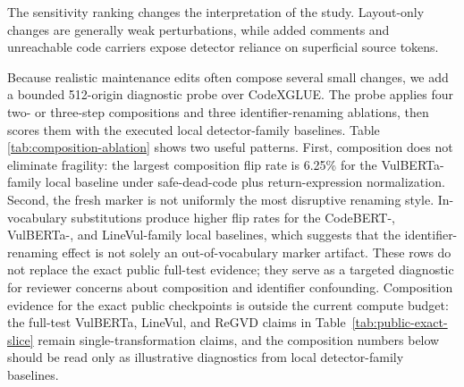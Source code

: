\documentclass[a4paper,fleqn]{cas-dc}
\begin{document}
The sensitivity ranking changes the interpretation of the study. Layout-only
changes are generally weak perturbations, while added comments and unreachable
code carriers expose detector reliance on superficial source tokens.

Because realistic maintenance edits often compose several small changes, we add
a bounded 512-origin diagnostic probe over CodeXGLUE. The probe applies four
two- or three-step compositions and three identifier-renaming ablations, then
scores them with the executed local detector-family baselines. Table
\ref{tab:composition-ablation} shows two useful patterns. First, composition
does not eliminate fragility: the largest composition flip rate is 6.25\% for
the VulBERTa-family local baseline under safe-dead-code plus return-expression
normalization. Second, the fresh marker is not uniformly the most disruptive
renaming style. In-vocabulary substitutions produce higher flip rates for the
CodeBERT-, VulBERTa-, and LineVul-family local baselines, which suggests that
the identifier-renaming effect is not solely an out-of-vocabulary marker
artifact. These rows do not replace the exact public full-test evidence; they
serve as a targeted diagnostic for reviewer concerns about composition and
identifier confounding.
Composition evidence for the exact public checkpoints is outside the current
compute budget: the full-test VulBERTa, LineVul, and ReGVD claims in
Table~\ref{tab:public-exact-slice} remain single-transformation claims, and the
composition numbers below should be read only as illustrative diagnostics from
local detector-family baselines.

\begin{table}[t]
  \centering
  \caption{Diagnostic composition and identifier-renaming ablation on a 512-origin CodeXGLUE subset using executed local detector-family baselines.}
  \label{tab:composition-ablation}
\end{table}
\end{document}
